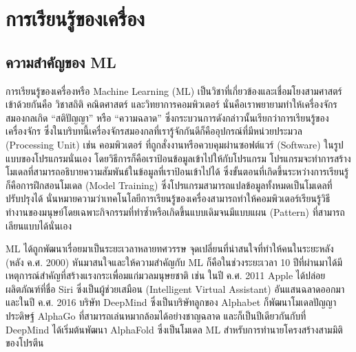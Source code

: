 

\chapter{การเรียนรู้ของเครื่อง}
\label{ch:ml}

\section{ความสำคัญของ ML}

การเรียนรู้ของเครื่องหรือ Machine Learning (ML) เป็นวิชาที่เกี่ยวข้องและเชื่อมโยงสามศาสตร์เข้าด้วยกันคือ วิชาสถิติ คณิตศาสตร์ และวิทยาการคอมพิวเตอร์
นั่นคือเราพยายามทำให้เครื่องจักรสมองกลเกิด \enquote{สติปัญญา} หรือ \enquote{ความฉลาด} ซึ่งกระบวนการดังกล่าวนั้นเรียกว่าการเรียนรู้ของเครื่องจักร 
ซึ่งในบริบทนี้เครื่องจักรสมองกลที่เรารู้จักกันดีก็คืออุปกรณ์ที่มีหน่วยประมวล (Processing Unit) เช่น คอมพิวเตอร์ ที่ถูกสั่งงานหรือควบคุมผ่านซอฟต์แวร์ (Software) 
ในรูปแบบของโปรแกรมนั่นเอง โดยวิธีการก็คือเราป้อนข้อมูลเข้าไปให้กับโปรแกรม โปรแกรมจะทำการสร้างโมเดลที่สามารถอธิบายความสัมพันธ์ในข้อมูลที่เราป้อนเข้าไปได้ 
ซึ่งขั้นตอนที่เกิดขึ้นระหว่างการเรียนรู้ก็คือการฝึกสอนโมเดล (Model Training) ซึ่งโปรแกรมสามารถแปลข้อมูลทั้งหมดเป็นโมเดลที่ปรับปรุงได้ 
นั่นหมายความว่าเทคโนโลยีการเรียนรู้ของเครื่องสามารถทำให้คอมพิวเตอร์เรียนรู้วิธีทำงานของมนุษย์โดยเฉพาะกิจกรรมที่ทำซ้ำหรือเกิดขึ้นแบบเดิมจนมีแบบแผน 
(Pattern) ที่สามารถเลียนแบบได้นั่นเอง 

ML ได้ถูกพัฒนาเรื่อยมาเป็นระยะเวลาหลายทศวรรษ จุดเปลี่ยนที่น่าสนใจที่ทำให้คนในระยะหลัง (หลัง ค.ศ. 2000) หันมาสนใจและให้ความสำคัญกับ ML 
ก็คือในช่วงระยะเวลา 10 ปีที่ผ่านมาได้มีเหตุการณ์สำคัญที่สร้างแรงกระเพื่อมแก่มวลมนุษยชาติ เช่น ในปี ค.ศ. 2011 Apple ได้ปล่อยผลิตภัณฑ์ที่ชื่อ 
Siri ซึ่งเป็นผู้ช่วยเสมือน (Intelligent Virtual Assistant) อันแสนฉลาดออกมา และในปี ค.ศ. 2016 บริษัท DeepMind ซึ่งเป็นบริษัทลูกของ
Alphabet ก็พัฒนาโมเดลปัญญาประดิษฐ์ AlphaGo ที่สามารถเล่นหมากล้อมได้อย่างชาญฉลาด และก็เป็นปีเดียวกันกับที่ DeepMind ได้เริ่มต้นพัฒนา 
AlphaFold ซึ่งเป็นโมเดล ML สำหรับการทำนายโครงสร้างสามมิติของโปรตีน

